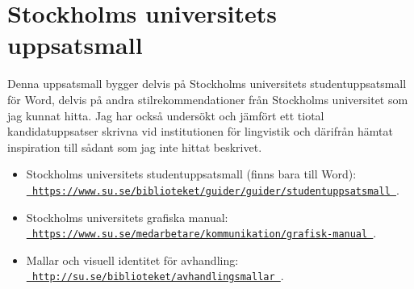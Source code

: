 
\section{Stockholms universitets uppsatsmall}
\label{utseende}

Denna uppsatsmall bygger delvis på Stockholms universitets studentuppsatsmall
för Word, delvis på andra stilrekommendationer från Stockholms universitet som
jag kunnat hitta. Jag har också undersökt och jämfört ett tiotal
kandidatuppsatser skrivna vid institutionen för lingvistik och därifrån hämtat
inspiration till sådant som jag inte hittat beskrivet.

\medskip

\begin{itemize}
\raggedright%
\item Stockholms universitets studentuppsatsmall (finns bara till Word):
  \\\href{%
    https://www.su.se/biblioteket/guider/guider/studentuppsatsmall%
  }{\texttt{%
      https://\linebreak[0]www.su.se/\linebreak[0]biblioteket/\linebreak[0]%
      guider/\linebreak[0]guider/\linebreak[0]studentuppsatsmall%
  }}.

\item Stockholms universitets grafiska manual:
  \\\href{%
    https://www.su.se/medarbetare/kommunikation/grafisk-manual%
  }{\texttt{%
      https://\linebreak[0]www.su.se/\linebreak[0]medarbetare/\linebreak[0]%
      kommunikation/\linebreak[0]grafisk-manual%
  }}.

\item Mallar och visuell identitet för avhandling:
  \\\href{%
    http://su.se/biblioteket/avhandlingsmallar%
  }{\texttt{%
      http://\linebreak[0]su.se/\linebreak[0]biblioteket/\linebreak[0]%
      avhandlingsmallar%
  }}.


\end{itemize}
